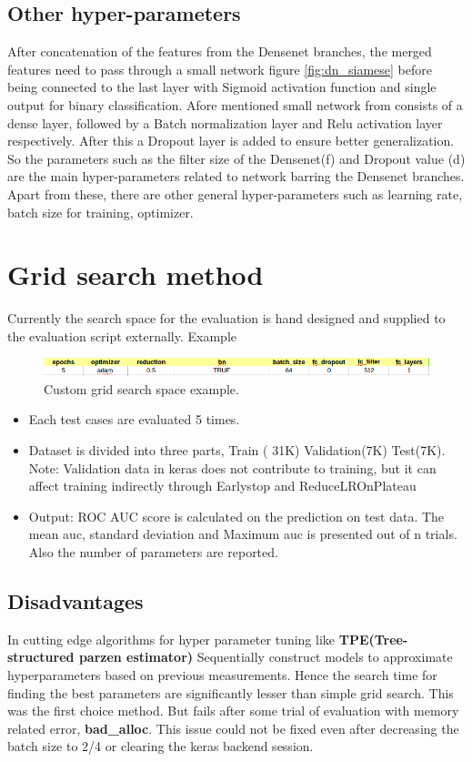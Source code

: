 \subsection{Other hyper-parameters}
After concatenation of the features from the Densenet branches, the merged features need to pass through a small network figure \ref{fig:dn_siamese} before being connected to the 
last layer with Sigmoid activation function and single output for binary classification. Afore mentioned small network from consists of a dense layer, followed by a Batch 
normalization layer and Relu activation layer respectively. After this a Dropout layer is added to ensure better generalization. So the parameters such as the filter size 
of the Densenet(f) and Dropout value (d) are the main hyper-parameters related to network barring the Densenet branches. Apart from these, there are other general hyper-parameters
such as learning rate, batch size for training, optimizer. 

\section{Grid search method}
Currently the search space for the evaluation is hand designed and supplied to the evaluation script externally. Example
\begin{figure}[ht]
\centering
\includegraphics[width=1\textwidth]{images/densenet/test_cases.png}
\caption{\label{fig:search_space}Custom grid search space example.}
\end{figure}


\begin{itemize}
 \item Each test cases are evaluated 5 times.
 \item Dataset is divided into three parts, Train ( 31K) Validation(7K) Test(7K). Note: Validation data in keras does not contribute to training, 
 but it can affect training indirectly through Earlystop and ReduceLROnPlateau
 \item Output: ROC AUC score is calculated on the prediction on test data. The mean auc, standard deviation and Maximum auc is presented out of n trials. 
 Also the number of parameters are reported.
\end{itemize}

\subsection{Disadvantages}
In cutting edge algorithms for hyper parameter tuning like \textbf{TPE(Tree-structured parzen estimator)}
Sequentially construct models to approximate hyperparameters based on previous measurements. Hence the search time for finding the best parameters are significantly lesser than 
simple grid search.
This was the first choice method. But fails after some trial of evaluation with memory related error, \textbf{bad\_alloc}. This issue could not be fixed even after decreasing 
the batch size to 2/4 or clearing the keras backend session.

